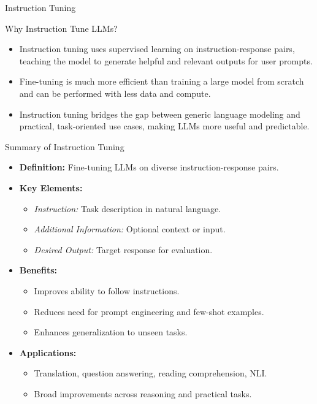 \begin{frame}[allowframebreaks]{Instruction Tuning}
\begin{block}{Why Instruction Tune LLMs?}
\begin{itemize}
            \item Instruction tuning uses supervised learning on instruction-response pairs, teaching the model to generate helpful and relevant outputs for user prompts.
            \item Fine-tuning is much more efficient than training a large model from scratch and can be performed with less data and compute.
            \item Instruction tuning bridges the gap between generic language modeling and practical, task-oriented use cases, making LLMs more useful and predictable.
        \end{itemize}
    \end{block}
    \framebreak
    \begin{block}{Summary of Instruction Tuning}
        \begin{itemize}
            \setlength{\itemsep}{1em}
            \item \textbf{Definition:} Fine-tuning LLMs on diverse instruction-response pairs.
            \item \textbf{Key Elements:}
            \begin{itemize}
                \item \textit{Instruction:} Task description in natural language.
                \item \textit{Additional Information:} Optional context or input.
                \item \textit{Desired Output:} Target response for evaluation.
            \end{itemize}
            \item \textbf{Benefits:}
            \begin{itemize}
                \item Improves ability to follow instructions.
                \item Reduces need for prompt engineering and few-shot examples.
                \item Enhances generalization to unseen tasks.
            \end{itemize}
            \item \textbf{Applications:}
            \begin{itemize}
                \item Translation, question answering, reading comprehension, NLI.
                \item Broad improvements across reasoning and practical tasks.
            \end{itemize}

\end{itemize}
\end{block}
\end{frame}

